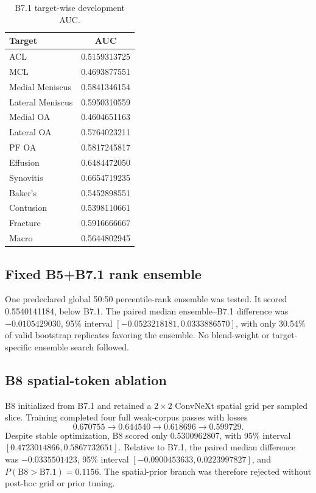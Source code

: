 \documentclass[preprint,12pt]{elsarticle}
\begin{document}
\begin{table}[ht]
\centering
\caption{B7.1 target-wise development AUC.}
\label{tab:b71target}
\begin{tabular}{lc}
\toprule
Target & AUC \\
\midrule
ACL & 0.5159313725 \\
MCL & 0.4693877551 \\
Medial Meniscus & 0.5841346154 \\
Lateral Meniscus & 0.5950310559 \\
Medial OA & 0.4604651163 \\
Lateral OA & 0.5764023211 \\
PF OA & 0.5817245817 \\
Effusion & 0.6484472050 \\
Synovitis & 0.6654719235 \\
Baker's & 0.5452898551 \\
Contusion & 0.5398110661 \\
Fracture & 0.5916666667 \\
\midrule
Macro & 0.5644802945 \\
\bottomrule
\end{tabular}
\end{table}

\subsection{Fixed B5+B7.1 rank ensemble}
One predeclared global 50:50 percentile-rank ensemble was tested. It scored 0.5540141184, below B7.1. The paired median ensemble--B7.1 difference was $-0.0105429030$, 95\% interval $[-0.0523218181,0.0333886570]$, with only 30.54\% of valid bootstrap replicates favoring the ensemble. No blend-weight or target-specific ensemble search followed.

\subsection{B8 spatial-token ablation}
B8 initialized from B7.1 and retained a $2\times2$ ConvNeXt spatial grid per sampled slice. Training completed four full weak-corpus passes with losses
\begin{equation*}
0.670755\rightarrow0.644540\rightarrow0.618696\rightarrow0.599729.
\end{equation*}
Despite stable optimization, B8 scored only 0.5300962807, with 95\% interval $[0.4723014866,0.5867732651]$. Relative to B7.1, the paired median difference was $-0.0335501423$, 95\% interval $[-0.0900453633,0.0223997827]$, and $P(\mathrm{B8}>\mathrm{B7.1})=0.1156$. The spatial-prior branch was therefore rejected without post-hoc grid or prior tuning.
\end{document}
